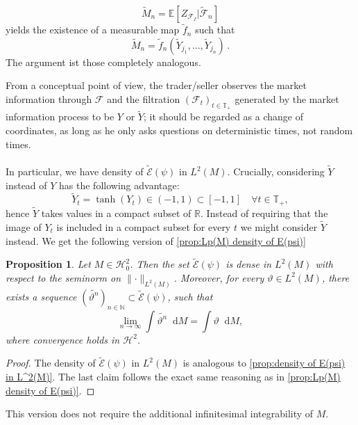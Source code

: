 \documentclass[11pt,a4paper,twoside,openany]{report}
\newcommand{\diff}{\mathop{}\!\mathrm{d}}
\theoremstyle{plain} %
\newtheorem{proposition}[proposition]{Proposition}
\theoremstyle{definition} %
\theoremstyle{remark} %
\begin{document}
 \begin{equation}
     \widetilde{M}_n=\mathbb{E}[Z_{\mathcal{F}_I}|\widetilde{\mathcal{F}}_n]
 \end{equation}
 yields the existence of a measurable map \(\widetilde{f}_n\) such that
 \begin{equation}
      \widetilde{M}_n=\widetilde{f}_n(\widetilde{Y}_{j_1},\dots,\widetilde{Y}_{j_n})\,.
 \end{equation}
 The argument ist those completely analogous.
 
 
 From a conceptual point of view, the trader/seller observes the market information through \(\mathcal{F}\) and the filtration \((\mathcal{F}_t)_{t\in\mathbb{T}_+}\) generated by the market information process to be \(Y\) or \(\widetilde{Y}\); it should be regarded as a change of coordinates, as long as he only asks questions on deterministic times, not random times. 
 \\\\
 In particular, we have density of \(\widetilde{\mathcal{E}}(\psi)\) in \(L^2(M)\). Crucially, considering \(\widetilde{Y}\) instead of \(Y\) has the following advantage:
\begin{equation}
\widetilde{Y}_t=\tanh(Y_t)\in(-1,1)\subset[-1,1]\quad\forall t\in\mathbb{T}_+,
\end{equation}
hence \(\widetilde{Y}\) takes values in a compact subset of \(\mathbb{R}\). Instead of requiring that the image of \(Y_t\) is included in a compact subset for every \(t\) we might consider \(\widetilde{Y}\) instead. 
\bigbreak
We get the following version of \cref{prop:Lp(M) density of E(psi)}
\begin{proposition}\label{prop:Lp(M) density of E(psi) under compacteness}
    Let \(M\in\mathcal{H}_0^{2}\). Then the set \(\widetilde{\mathcal{E}}(\psi)\) is dense in \(L^2(M)\) with respect to the seminorm on \(\lVert\cdot\rVert_{L^2(M)}\). Moreover, for every \(\vartheta\in L^2(M)\), there exists a sequence \((\widetilde{\vartheta^n})_{n\in\mathbb{N}}\subset\widetilde{\mathcal{E}}(\psi)\), such that
    \begin{equation}
        \lim_{n\to\infty}\int \widetilde{\vartheta^n}\diff M=\int \vartheta\diff M,
    \end{equation}
    where convergence holds in \(\mathcal{H}^2\). 
\end{proposition}
\begin{proof}
    The density of \(\widetilde{\mathcal{E}}(\psi)\) in \(L^2(M)\) is analogous to \cref{prop:density of E(psi) in L^2(M)}. The last claim follows the exact same reasoning as in \cref{prop:Lp(M) density of E(psi)}.
\end{proof}
This version does not require the additional infinitesimal integrability of \(M\).  
\end{document}
